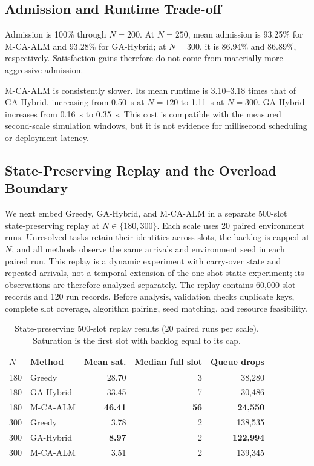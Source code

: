 \documentclass[pdflatex,sn-mathphys-num]{sn-jnl}
\begin{document}
\subsection{Admission and Runtime Trade-off}
Admission is 100\% through $N=200$. At $N=250$, mean admission is 93.25\% for M-CA-ALM and 93.28\% for GA-Hybrid; at $N=300$, it is 86.94\% and 86.89\%, respectively. Satisfaction gains therefore do not come from materially more aggressive admission.

M-CA-ALM is consistently slower. Its mean runtime is 3.10--3.18 times that of GA-Hybrid, increasing from 0.50~s at $N=120$ to 1.11~s at $N=300$. GA-Hybrid increases from 0.16~s to 0.35~s. This cost is compatible with the measured second-scale simulation windows, but it is not evidence for millisecond scheduling or deployment latency.

\subsection{State-Preserving Replay and the Overload Boundary}
We next embed Greedy, GA-Hybrid, and M-CA-ALM in a separate 500-slot state-preserving replay at $N\in\{180,300\}$. Each scale uses 20 paired environment runs. Unresolved tasks retain their identities across slots, the backlog is capped at $N$, and all methods observe the same arrivals and environment seed in each paired run. This replay is a dynamic experiment with carry-over state and repeated arrivals, not a temporal extension of the one-shot static experiment; its observations are therefore analyzed separately. The replay contains 60,000 slot records and 120 run records. Before analysis, validation checks duplicate keys, complete slot coverage, algorithm pairing, seed matching, and resource feasibility.

\begin{table}[t]
\centering
\caption{State-preserving 500-slot replay results (20 paired runs per scale). Saturation is the first slot with backlog equal to its cap.}
\label{tab:official_replay}
\scriptsize
\begin{tabular}{llrrr}
\toprule
$N$ & Method & Mean sat. & Median full slot & Queue drops \\
\midrule
180 & Greedy & 28.70 & 3 & 38,280 \\
180 & GA-Hybrid & 33.45 & 7 & 30,486 \\
180 & M-CA-ALM & \textbf{46.41} & \textbf{56} & \textbf{24,550} \\
300 & Greedy & 3.78 & 2 & 138,535 \\
300 & GA-Hybrid & \textbf{8.97} & 2 & \textbf{122,994} \\
300 & M-CA-ALM & 3.51 & 2 & 139,345 \\
\bottomrule
\end{tabular}
\end{table}
\end{document}
